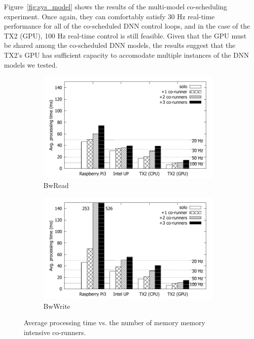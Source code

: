 Figure~\ref{fig:sys_model} shows the results of the
multi-model co-scheduling experiment. Once again, they can comfortably
satisfy 30 Hz real-time performance for all of the co-scheduled DNN control
loops, and in the case of the TX2 (GPU), 100 Hz real-time control is still
feasible. Given that the GPU must be shared among the co-scheduled DNN
models, the results suggest that the TX2's GPU has sufficient capacity to
accomodate multiple instances of the DNN models we tested.

\begin{figure}[h]
  \centering
  \begin{subfigure}{0.4\textwidth}
    \includegraphics[width=\textwidth]{figs/compare_benchmark_read}
    \caption{BwRead}
    \label{fig:sys_bench_read}
  \end{subfigure}
  \hfill
  \begin{subfigure}{0.4\textwidth}
    \includegraphics[width=\textwidth]{figs/compare_benchmark}
    \caption{BwWrite}
    \label{fig:sys_bench_write}    
  \end{subfigure}
  \caption{Average processing time vs. the number of memory
    memory intensive co-runners.}
  \label{fig:sys_bench}    
\end{figure} 

